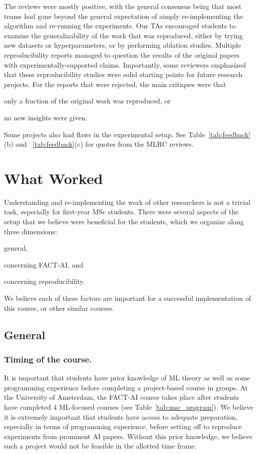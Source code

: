 \documentclass[letterpaper]{article}
\newcommand{\OurUniversity}{the University of Amsterdam}
\begin{document}
The reviews were mostly positive, with the general consensus being that most teams had gone beyond the general expectation of simply re-implementing the algorithm and re-running the experiments.
Our TAs encouraged students to examine the generalizability of the work that was reproduced, either by trying new datasets or hyperparameters, or by performing ablation studies.
Multiple reproducibility reports managed to question the results of the original papers with experimentally-supported claims.
Importantly, some reviewers emphasized that these reproducibility studies were solid starting points for future research projects.
For the reports that were rejected, the main critiques were that
\begin{enumerate*}[label=(\roman*)]
    \item only a fraction of the original work was reproduced, or
    \item no new insights were given.
\end{enumerate*}
Some projects also had flaws in the experimental setup.
See Table~\ref{tab:feedback}(b) and  ~\ref{tab:feedback}(c) for quotes from the MLRC reviews.






\section{What Worked}
\label{section:whatworked}

Understanding and re-implementing the work of other researchers is not a trivial task, especially for first-year MSc students. There were several aspects of the setup that we believe were beneficial for the students, which we organize along three dimensions:
\begin{enumerate*}[label=(\roman*)]
    \item general,
    \item concerning FACT-AI, and
    \item concerning reproducibility.
\end{enumerate*}
We believe each of these factors are important for a successful implementation of this course, or other similar courses.

\subsection{General}

\subsubsection{Timing of the course.}
It is important that students have prior knowledge of ML theory as well as some programming experience before completing a project-based course in groups. At \OurUniversity{}, the FACT-AI course takes place after students have completed 4 ML-focused courses (see Table~\ref{tab:msc_program}).
We believe it is extremely important that students have access to adequate preparation, especially in terms of programming experience, before setting off to reproduce experiments from prominent AI papers.
Without this prior knowledge, we believe such a project would not be feasible in the allotted time frame.
\end{document}
